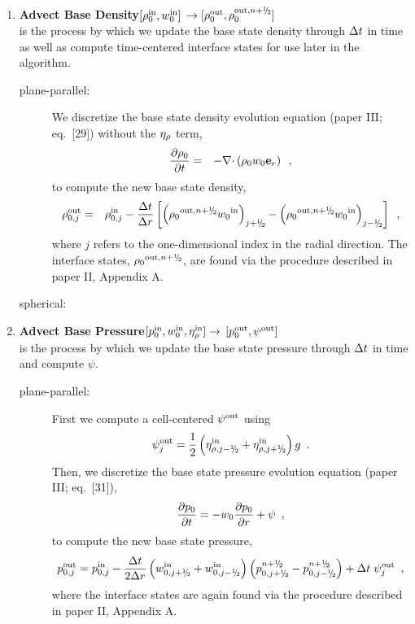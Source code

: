 \begin{enumerate}
\item {\bf Advect Base Density}$[\rho_0^{\mathrm{in}},w_0^{\mathrm{in}}]$
$\rightarrow [\rho_0^\outp,\rho_0^{\outp,n+\myhalf}]$\\
is the process by which we update the base state density through $\Delta t$ in time
as well as compute time-centered interface states for use later in the algorithm.
\begin{description}

\item[plane-parallel:] We discretize the base state density evolution 
equation (paper III; eq.~[29]) without the $\eta_{\rho}$ term,
\begin{eqnarray}
\frac{\partial \rho_0}{\partial t} &=& - \mathbf{\nabla} \mathbf{\cdot} \left( \rho_0 w_0 \mathbf{e}_r \right)
\enskip ,
\label{eq:rho0upd_new}
\end{eqnarray}
to compute the new base state density,
\begin{eqnarray}
\rho_{0,j}^{\outp} &=& \rho_{0,j}^{\inp} - \frac{\dt}{\dr} 
\left [ \left( {{\rho}_0}^{\outp,\nph} {w_0}^{\inp}\right)_{j+\myhalf} -  
         \left( {{\rho}_0}^{\outp,\nph} {w_0}^{\inp}\right)_{j-\myhalf} \right ]
         \nonumber \enskip,
\end{eqnarray}
where $j$ refers to the one-dimensional index in the radial direction.
The interface states, ${{\rho}_0}^{\outp,\nph}$, are found via the
procedure described in paper II, Appendix A.

\item[spherical:]

\end{description}

\item {\bf Advect Base Pressure}$[p_0^{\mathrm{in}},w_0^{\mathrm{in}},\eta_{\rho}^{\mathrm{in}}] \rightarrow$ 
$[p_0^{\mathrm{out}},\psi^{\mathrm{out}}]$\\
is the process by which we update the base state pressure through $\Delta t$ in time and
compute $\psi$.
\begin{description}

\item[plane-parallel:] First we compute a cell-centered $\psi^{\mathrm{out}}$ using
\begin{equation}
 \psi_j^\outp = \frac{1}{2} \left(\eta_{\rho,j-\myhalf}^\inp + \eta_{\rho,j+\myhalf}^\inp\right) g \enskip .
\end{equation}
Then, we discretize the base state pressure evolution equation (paper III; eq.~[31]),
\begin{equation}
\frac{\partial p_0}{\partial t} = 
-w_0 \frac{\partial p_0}{\partial r} + \psi \enskip ,
\label{eq:p0upd_new}
\end{equation}
to compute the new base state pressure,
\begin{equation}
p_{0,j}^\outp = p_{0,j}^\inp - \frac{\dt}{2\dr} \left (w_{0,j+\myhalf}^\inp
+ w_{0,j-\myhalf}^\inp \right)
\left (p_{0,j+\myhalf}^{n+\myhalf} -p_{0,j-\myhalf}^{n+\myhalf} \right ) + \dt \; \psi_j^\outp 
\enskip,
\end{equation}
where the interface states are again found via the procedure described
in paper II, Appendix A.


\end{description}
\end{enumerate}
